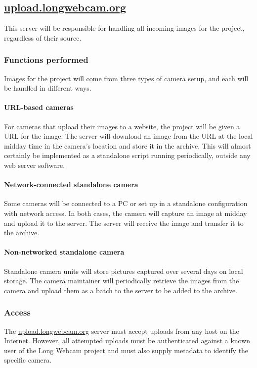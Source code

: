 \documentclass[11pt]{article}
\begin{document}
\subsection{\protect\url{upload.longwebcam.org}}

This server will be responsible for handling all incoming images for the project, regardless of their source.

\subsubsection{Functions performed}

Images for the project will come from three types of camera setup, and each will be handled in different ways.

\paragraph{URL-based cameras} For cameras that upload their images to a website, the project will be given a URL for the image. The server will download an image from the URL at the local midday time in the camera's location and store it in the archive. This will almost certainly be implemented as a standalone script running periodically, outside any web server software.

\paragraph{Network-connected standalone camera} Some cameras will be connected to a PC or set up in a standalone configuration with network access. In both cases, the camera will capture an image at midday and upload it to the server. The server will receive the image and transfer it to the archive.

\paragraph{Non-networked standalone camera} Standalone camera units will store pictures captured over several days on local storage. The camera maintainer will periodically retrieve the images from the camera and upload them as a batch to the server to be added to the archive.

\subsubsection{Access}

The \url{upload.longwebcam.org} server must accept uploads from any host on the Internet. However, all attempted uploads must be authenticated against a known user of the Long Webcam project and must also supply metadata to identify the specific camera.
\end{document}

